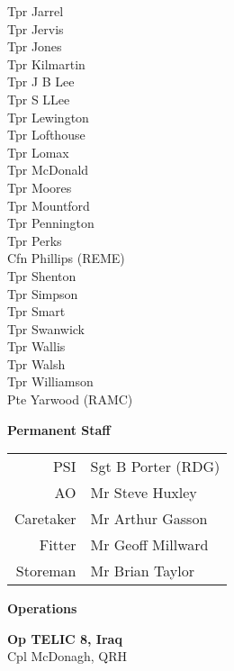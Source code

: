\begin{multicols}{3}
  Tpr Jarrel \\
  Tpr Jervis \\
  Tpr Jones \\
  Tpr Kilmartin \\
  Tpr J B Lee \\
  Tpr S LLee \\
  Tpr Lewington \\
  Tpr Lofthouse \\
  Tpr Lomax \\
  Tpr McDonald \\
  Tpr Moores \\
  Tpr Mountford \\
  Tpr Pennington \\
  Tpr Perks \\
  Cfn Phillips (REME) \\
  Tpr Shenton \\
  Tpr Simpson \\
  Tpr Smart \\
  Tpr Swanwick \\
  Tpr Wallis \\
  Tpr Walsh \\
  Tpr Williamson \\
  Pte Yarwood (RAMC) \\
\end{multicols}

\begin{center}
  \Large
  \textbf{Permanent Staff}
\end{center}

\begin{center}
  \begin{tabular}{rl}
    PSI & Sgt B Porter (RDG) \\
    AO & Mr Steve Huxley \\
    Caretaker & Mr Arthur Gasson \\
    Fitter & Mr Geoff Millward \\
    Storeman & Mr Brian Taylor \\
  \end{tabular}
\end{center}

\vspace*{5mm}

\begin{center}
  \Large
  \textbf{Operations}
\end{center}

\begin{center}
  \noindent
  \textbf{Op TELIC 8, Iraq} \\
  Cpl McDonagh, QRH \\
\end{center}

